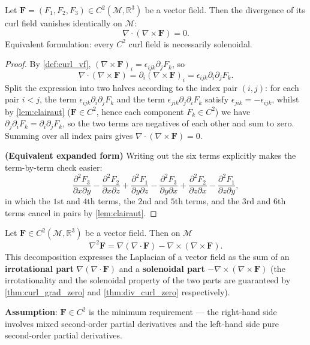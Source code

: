 \begin{theorem}\label{thm:div_curl_zero}
Let $\mathbf{F} = (F_1, F_2, F_3) \in C^2(\mathcal{M}, \mathbb{R}^3)$ be a vector field. Then the divergence of its curl field vanishes identically on $\mathcal M$:
\[
\nabla \cdot (\nabla \times \mathbf{F}) = 0.
\]
Equivalent formulation: every $C^2$ curl field is necessarily solenoidal.
\end{theorem}

\begin{proof}
By \cref{def:curl_vf}, $(\nabla\times\mathbf F)_i = \epsilon_{ijk}\partial_jF_k$, so
\[
\nabla\cdot(\nabla\times\mathbf F) = \partial_i(\nabla\times\mathbf F)_i = \epsilon_{ijk}\partial_i\partial_jF_k .
\]
Split the expression into two halves according to the index pair $(i,j)$: for each pair $i<j$, the term $\epsilon_{ijk}\partial_i\partial_jF_k$ and the term $\epsilon_{jik}\partial_j\partial_iF_k$ satisfy $\epsilon_{jik}=-\epsilon_{ijk}$, whilst by \cref{lem:clairaut} ($\mathbf F\in C^2$, hence each component $F_k\in C^2$) we have $\partial_j\partial_iF_k=\partial_i\partial_jF_k$, so the two terms are negatives of each other and sum to zero. Summing over all index pairs gives $\nabla\cdot(\nabla\times\mathbf F)=0$.

\textbf{(Equivalent expanded form)} Writing out the six terms explicitly makes the term-by-term check easier:
\[
\frac{\partial^2 F_3}{\partial x \partial y} - \frac{\partial^2 F_2}{\partial x \partial z} + \frac{\partial^2 F_1}{\partial y \partial z} - \frac{\partial^2 F_3}{\partial y \partial x} + \frac{\partial^2 F_2}{\partial z \partial x} - \frac{\partial^2 F_1}{\partial z \partial y},
\]
in which the $1$st and $4$th terms, the $2$nd and $5$th terms, and the $3$rd and $6$th terms cancel in pairs by \cref{lem:clairaut}.
\end{proof}

\begin{theorem}\label{thm:laplacian_decomp}
Let $\mathbf{F} \in C^2(\mathcal{M}, \mathbb{R}^3)$ be a vector field. Then on $\mathcal M$
\[
\nabla^2 \mathbf{F} = \nabla(\nabla \cdot \mathbf{F}) - \nabla \times (\nabla \times \mathbf{F}).
\]
This decomposition expresses the Laplacian of a vector field as the sum of an \textbf{irrotational part} $\nabla(\nabla\cdot\mathbf F)$ and a \textbf{solenoidal part} $-\nabla\times(\nabla\times\mathbf F)$ (the irrotationality and the solenoidal property of the two parts are guaranteed by \cref{thm:curl_grad_zero} and \cref{thm:div_curl_zero} respectively).

\textbf{Assumption}: $\mathbf F\in C^2$ is the minimum requirement --- the right-hand side involves mixed second-order partial derivatives and the left-hand side pure second-order partial derivatives.
\end{theorem}

